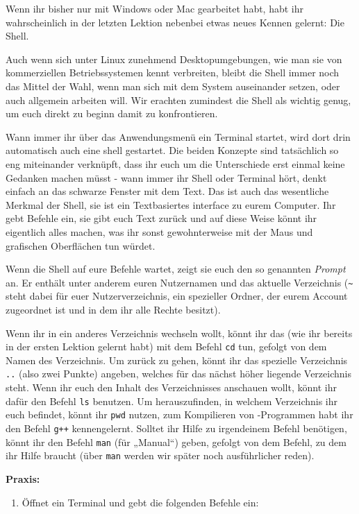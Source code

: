
Wenn ihr bisher nur mit Windows oder Mac gearbeitet habt, habt ihr
wahrscheinlich in der letzten Lektion nebenbei etwas neues Kennen gelernt: Die
Shell.

Auch wenn sich unter Linux zunehmend Desktopumgebungen, wie man sie von
kommerziellen Betriebssystemen kennt verbreiten, bleibt die Shell immer noch das
Mittel der Wahl, wenn man sich mit dem System auseinander setzen, oder auch
allgemein arbeiten will. Wir erachten zumindest die Shell als wichtig genug, um
euch direkt zu beginn damit zu konfrontieren.

Wann immer ihr über das Anwendungsmenü ein Terminal startet, wird dort drin
automatisch auch eine shell gestartet. Die beiden Konzepte sind tatsächlich so
eng miteinander verknüpft, dass ihr euch um die Unterschiede erst einmal keine
Gedanken machen müsst - wann immer ihr Shell oder Terminal hört, denkt einfach
an das schwarze Fenster mit dem Text. Das ist auch das wesentliche Merkmal der
Shell, sie ist ein Textbasiertes interface zu eurem Computer. Ihr gebt Befehle
ein, sie gibt euch Text zurück und auf diese Weise könnt ihr eigentlich alles
machen, was ihr sonst gewohnterweise mit der Maus und grafischen Oberflächen
tun würdet.

Wenn die Shell auf eure Befehle wartet, zeigt sie euch den so genannten
\emph{Prompt} an. Er enthält unter anderem euren Nutzernamen und das aktuelle
Verzeichnis (\verb|~| steht dabei für euer Nutzerverzeichnis, ein spezieller
Ordner, der eurem Account zugeordnet ist und in dem ihr alle Rechte besitzt).

Wenn ihr in ein anderes Verzeichnis wechseln wollt, könnt ihr das (wie ihr
bereits in der ersten Lektion gelernt habt) mit dem Befehl \texttt{cd} tun,
gefolgt von dem Namen des Verzeichnis. Um zurück zu gehen, könnt ihr das
spezielle Verzeichnis \texttt{..} (also zwei Punkte) angeben, welches für das
nächst höher liegende Verzeichnis steht. Wenn ihr euch den Inhalt des
Verzeichnisses anschauen wollt, könnt ihr dafür den Befehl \texttt{ls}
benutzen. Um herauszufinden, in welchem Verzeichnis ihr euch befindet, könnt
ihr \texttt{pwd} nutzen, zum Kompilieren von \Cpp-Programmen habt ihr den Befehl
\texttt{g++} kennengelernt. Solltet ihr Hilfe zu irgendeinem Befehl benötigen,
könnt ihr den Befehl \texttt{man} (für „Manual“) geben, gefolgt von dem Befehl,
zu dem ihr Hilfe braucht (über \texttt{man} werden wir später noch
ausführlicher reden).

\textbf{Praxis:}
\begin{enumerate}
    \item Öffnet ein Terminal und gebt die folgenden Befehle ein:
\end{enumerate}

